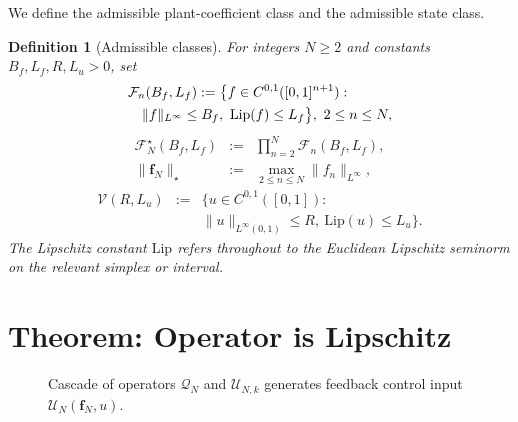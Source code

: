 \documentclass[10pt,a4paper]{amsart}
\newcommand{\Linf}{L^\infty}
\newcommand{\Lip}{\mathrm{Lip}}
\newtheorem{definition}{Definition}
\begin{document}
We define the admissible plant-coefficient class and the admissible state class.

\begin{definition}[Admissible classes]
\label{def:classes}
For integers $N\ge 2$ and constants $B_f, L_f, R, L_u > 0$, set
\begin{eqnarray}
\lefteqn{\mathcal{F}_n(B_f,L_f) := \bigl\{ f \in C^{0,1}([0,1]^{n+1}) :} \nonumber \\
&& \|f\|_{\Linf} \le B_f,\ \Lip(f) \le L_f \bigr\}, \ 2\le n\le N,
\label{eq:Fnclass}
\end{eqnarray}
\begin{eqnarray}
\mathcal{F}_N^\star(B_f,L_f) &:=& \prod_{n=2}^N \mathcal{F}_n(B_f,L_f), \nonumber \\
\|\mathbf{f}_N\|_\star &:=& \max_{2\le n\le N} \|f_n\|_{\Linf},
\label{eq:Fclass}
\end{eqnarray}
\begin{eqnarray}
\mathcal{V}(R,L_u) &:=&
\bigl\{ u \in C^{0,1}([0,1]) : \nonumber \\
&& \|u\|_{\Linf(0,1)} \le R,\ \Lip(u) \le L_u \bigr\}.
\label{eq:Vclass}
\end{eqnarray}
The Lipschitz constant $\Lip$ refers throughout to the Euclidean Lipschitz seminorm on the relevant simplex or interval.
\end{definition}

\section{Theorem: Operator is Lipschitz}
\label{sec:theorem}

\begin{figure}[t]
\centering
{}
\caption{Cascade of operators $\mathcal{Q}_N$ and $\mathcal{U}_{N,k}$ generates feedback control input $\mathcal{U}_N(\mathbf{f}_N, u)$.}
\label{fig:cascade}
\end{figure}
\end{document}
